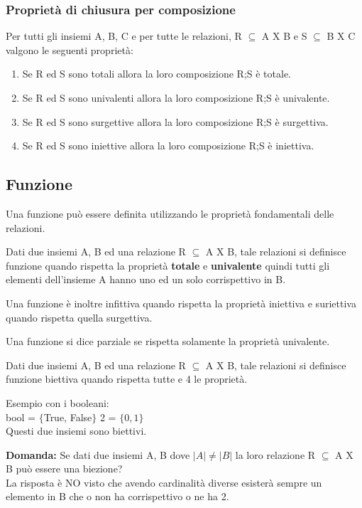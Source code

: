 \subsubsection{Proprietà di chiusura per composizione}
Per tutti gli insiemi A, B, C e per tutte le relazioni, R $\subseteq$ A X B e S $\subseteq$ B X C valgono le seguenti proprietà:
\begin{enumerate}
    \item Se R ed S sono totali allora la loro composizione R;S è totale.
    \item Se R ed S sono univalenti allora la loro composizione R;S è univalente.
    \item Se R ed S sono surgettive allora la loro composizione R;S è surgettiva.
    \item Se R ed S sono iniettive allora la loro composizione R;S è iniettiva.
\end{enumerate}

\subsection{Funzione}
Una funzione può essere definita utilizzando le proprietà fondamentali delle relazioni.
\begin{definition}[Funzione]
Dati due insiemi A, B ed una relazione R $\subseteq$ A X B, tale relazioni si definisce funzione quando rispetta la proprietà \textbf{totale} e \textbf{univalente} quindi tutti gli elementi dell'insieme A hanno uno ed un solo corrispettivo in B.
\end{definition}
Una funzione è inoltre infittiva quando rispetta la proprietà iniettiva e suriettiva quando rispetta quella surgettiva.
\begin{definition}
    Una funzione si dice parziale se rispetta solamente la proprietà univalente.
\end{definition}
\begin{definition}[Biezione]
Dati due insiemi A, B ed una relazione R $\subseteq$ A X B, tale relazioni si definisce funzione biettiva quando rispetta tutte e 4 le proprietà.
\end{definition}
\begin{example}
    Esempio con i booleani:\\
    bool = $\{$True, False$\}$ \hspace{1cm} 2 = $\{0, 1\}$\\
    Questi due insiemi sono biettivi.
\end{example}
\textbf{Domanda:} Se dati due insiemi A, B dove $|A| \neq |B|$ la loro relazione R $\subseteq$ A X B può essere una biezione?\\
La risposta è NO visto che avendo cardinalità diverse esisterà sempre un elemento in B che o non ha corrispettivo o ne ha 2.

